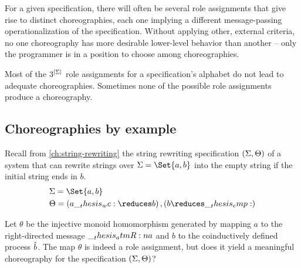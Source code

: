For a given specification, there will often be several role assignments that give rise to distinct choreographies, each one implying a different message-passing operationalization of the specification.
Without applying other, external criteria, no one choreography has more desirable lower-level behavior than another -- only the programmer is in a position to choose among choreographies.

Most of the $3^{\lvert\Sigma\rvert}$ role assignments for a specification's alphabet do not lead to adequate choreographies.
Sometimes none of the possible role assignments produce a choreography.

\subsection{Choreographies by example}\label{sec:choreographies:informal}


Recall from \cref{ch:string-rewriting} the string rewriting specification $(\Sigma, \Theta)$ of a system that can rewrite strings over $\sralph = \Set{a,b}$ into the empty string if the initial string ends in $b$.
\begin{equation*}
  \begin{lgathered}
    \sralph = \Set{a,b} \\
    \srsig = (a \wc \reduces b) \,, (b \reduces \emp)
  \end{lgathered}
\end{equation*}

Let $\theta$ be the injective monoid homomorphism generated by mapping $a$ to the right-directed message $\__thesis_atmR:n {a}$ and $b$ to the coinductively defined process $\hat{b}$.%
The map $\theta$ is indeed a role assignment, but does it yield a meaningful choreography for the specification $(\Sigma, \Theta)$?

